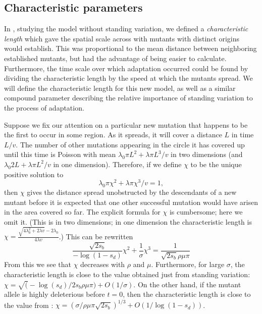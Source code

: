\documentclass{article}
\begin{document}
\subsection{Characteristic parameters}


In \citet{ralph2010parallel}, studying the model without standing variation,
we defined a {\em characteristic length} which gave the spatial scale across with mutants with distinct origins would establish.
This was proportional to the mean distance between neighboring established mutants,
but had the advantage of being easier to calculate.
Furthermore, the time scale over which adaptation occurred could be found by dividing the characteristic length 
by the speed at which the mutants spread.
We will define the characteristic length for this new model,
as well as a similar compound parameter describing the relative importance of standing variation to the process of adaptation.

Suppose we fix our attention on a particular new mutation that happens to be the first to occur in some region.
As it spreads, it will cover a distance $L$ in time $L/v$.
The number of other mutations appearing in the circle it has covered up until this time is Poisson with mean
$\lambda_0 \pi L^2 + \lambda \pi L^3 /v$ in two dimensions
(and $\lambda_0 2 L + \lambda \pi L^2 /v$ in one dimension).
Therefore, if we define $\chi$ to be the unique positive solution to
\[
    \lambda_0 \pi \chi^2 + \lambda \pi \chi^3 /v = 1,
\]
then $\chi$ gives the distance spread unobstructed by the descendants of a new mutant
before it is expected that one other successful mutation would have arisen in the area covered so far.
The explicit formula for $\chi$ is cumbersome; here we omit it.
(This is in two dimensions; in one dimension the characteristic length is $\chi = \frac{ \sqrt{ 4 \lambda_0^2 + 2\lambda v } - 2 \lambda_0 }{ 4 \lambda v }$.)
This can be rewritten 
\begin{equation} \label{eqn:defines_chi}
   \frac{\sqrt{2s_b} }{-\log(1-s_d) } \chi^2 + \frac{1}{\sigma} \chi^3 = \frac{1}{\sqrt{2s_b} \rho\mu\pi}
\end{equation}
From this we see that $\chi$ decreases with $\rho$ and $\mu$.
Furthermore, for large $\sigma$, the characteristic length is close to the value obtained just from standing variation:
$\chi = \sqrt( -\log(s_d) / 2 s_b \rho \mu \pi ) + O(1/\sigma)$.
On the other hand, if the mutant allele is highly deleterious before $t=0$,
then the characteristic length is close to the value from \citet{ralphcoop2010}:
$\chi = ( \sigma / \rho \mu \pi \sqrt{2 s_b} )^{1/3} + O(1/\log(1-s_d))$.
\end{document}
